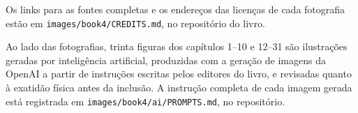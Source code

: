 Os links para as fontes completas e os endereços das licenças de cada
fotografia estão em \texttt{images/book4/CREDITS.md}, no repositório
do livro.

\bigskip
Ao lado das fotografias, trinta figuras dos capítulos 1--10 e 12--31
são ilustrações geradas por inteligência artificial, produzidas com a
geração de imagens da OpenAI a partir de instruções escritas pelos
editores do livro, e revisadas quanto à exatidão física antes da
inclusão. A instrução completa de cada imagem gerada está registrada
em \texttt{images/book4/ai/PROMPTS.md}, no repositório.
\clearpage
